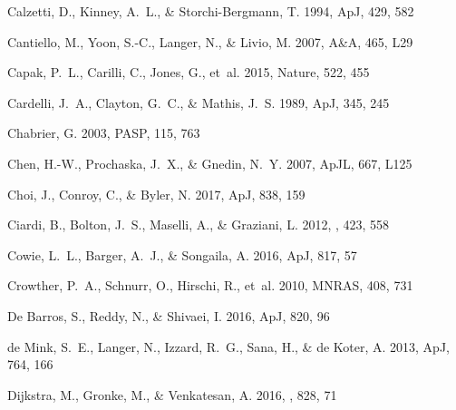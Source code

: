 \documentclass[iop]{emulateapj}
\begin{document}
\begin{thebibliography}{}
Calzetti, D., Kinney, A.~L., \& Storchi-Bergmann, T. 1994, ApJ, 429, 582

{Cantiello}, M., {Yoon}, S.-C., {Langer}, N., \& {Livio}, M. 2007, A\&A, 465,
  L29

{Capak}, P.~L., {Carilli}, C., {Jones}, G., {et~al.} 2015, Nature, 522, 455

Cardelli, J.~A., Clayton, G.~C., \& Mathis, J.~S. 1989, ApJ, 345, 245

Chabrier, G. 2003, PASP, 115, 763

{Chen}, H.-W., {Prochaska}, J.~X., \& {Gnedin}, N.~Y. 2007, ApJL, 667, L125

{Choi}, J., {Conroy}, C., \& {Byler}, N. 2017, ApJ, 838, 159

{Ciardi}, B., {Bolton}, J.~S., {Maselli}, A., \& {Graziani}, L. 2012, \mnras,
  423, 558

{Cowie}, L.~L., {Barger}, A.~J., \& {Songaila}, A. 2016, ApJ, 817, 57

{Crowther}, P.~A., {Schnurr}, O., {Hirschi}, R., {et~al.} 2010, MNRAS, 408, 731

{De Barros}, S., {Reddy}, N., \& {Shivaei}, I. 2016, ApJ, 820, 96

{de Mink}, S.~E., {Langer}, N., {Izzard}, R.~G., {Sana}, H., \& {de Koter}, A.
  2013, ApJ, 764, 166

{Dijkstra}, M., {Gronke}, M., \& {Venkatesan}, A. 2016, \apj, 828, 71


\end{thebibliography}
\end{document}
